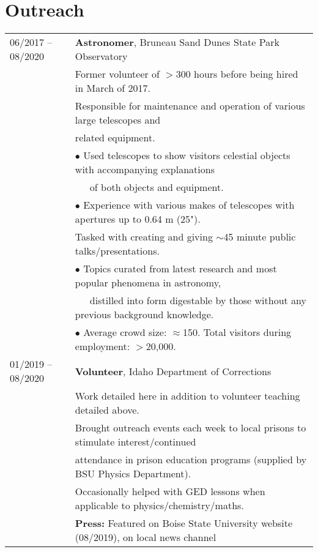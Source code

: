 \documentclass[11pt]{article}
\begin{document}
\section {Outreach}
\begin{tabular}{ll}
06/2017 -- 08/2020   &   \textbf{Astronomer}, Bruneau Sand Dunes State Park Observatory \\
      & Former volunteer of $>$300 hours before being hired in March of 2017.\vspace{1mm} \\
      & Responsible for maintenance and operation of various large telescopes and \\
      & related equipment.\\
      & $\bullet$ Used telescopes to show visitors celestial objects with accompanying explanations\\
      & \-\ \-\ \-\ of both objects and equipment.\\
      & $\bullet$ Experience with various makes of telescopes with apertures up to 0.64 m (25").\vspace{1mm} \\
      & Tasked with creating and giving $\sim$45 minute public talks/presentations.\\
      & $\bullet$ Topics curated from latest research and most popular phenomena in astronomy, \\
      & \-\ \-\ \-\ distilled into form digestable by those without any previous background knowledge.\\
      & $\bullet$ Average crowd size: $\approx$150. Total visitors during employment: $>$20,000.\vspace{2mm}\\
01/2019 -- 08/2020    &   \textbf{Volunteer}, Idaho Department of Corrections  \\
      & Work detailed here in addition to volunteer teaching detailed above. \vspace{1mm} \\
      & Brought outreach events each week to local prisons to stimulate interest/continued \\
      & attendance in prison education programs (supplied by BSU Physics Department). \\
      & Occasionally helped with GED lessons when applicable to physics/chemistry/maths.\vspace{1mm}\\
      & \textbf{Press:} Featured on Boise State University website (08/2019), on local news channel\\

\end{tabular}
\end{document}
